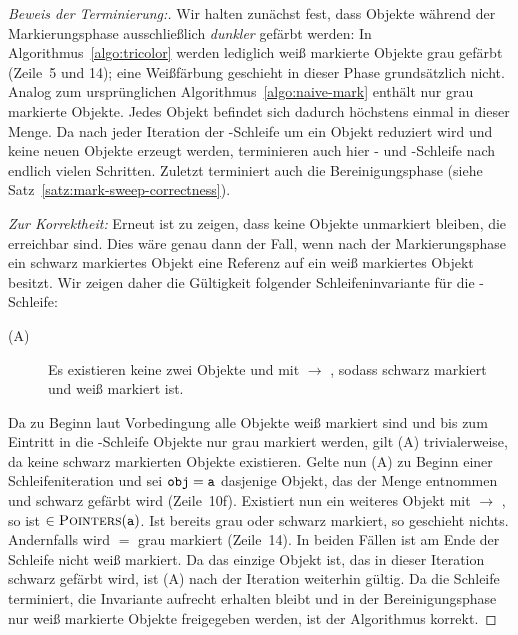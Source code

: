 \begin{proof}[Beweis der Terminierung:]
	Wir halten zunächst fest, dass Objekte während der Markierungsphase ausschließlich \textit{dunkler} gefärbt werden:
	In Algorithmus~\ref{algo:tricolor} werden lediglich weiß markierte Objekte grau gefärbt (Zeile~5 und 14); eine Weißfärbung geschieht in dieser Phase grundsätzlich nicht.
	Analog zum ursprünglichen Algorithmus~\ref{algo:naive-mark} enthält  nur grau markierte Objekte.
	Jedes Objekt befindet sich dadurch höchstens einmal in dieser Menge.
	Da  nach jeder Iteration der \WHILE-Schleife um ein Objekt reduziert wird und keine neuen Objekte erzeugt werden, terminieren auch hier \WHILE- und \FOREACH-Schleife nach endlich vielen Schritten.
	Zuletzt terminiert auch die Bereinigungsphase (siehe Satz~\ref{satz:mark-sweep-correctness}).
	
	\textit{Zur Korrektheit:} Erneut ist zu zeigen, dass keine Objekte unmarkiert bleiben, die erreichbar sind.
	Dies wäre genau dann der Fall, wenn nach der Markierungsphase ein schwarz markiertes Objekt eine Referenz auf ein weiß markiertes Objekt besitzt.
	Wir zeigen daher die Gültigkeit folgender Schleifeninvariante für die \WHILE-Schleife:
	\begin{description}
		\item[(A)] Es existieren keine zwei Objekte  und  mit  $\rightarrow$ , sodass  schwarz markiert und  weiß markiert ist.
	\end{description}
	Da zu Beginn laut Vorbedingung alle Objekte weiß markiert sind und bis zum Eintritt in die \WHILE-Schleife Objekte nur grau markiert werden, gilt (A) trivialerweise, da keine schwarz markierten Objekte existieren.
	Gelte nun (A) zu Beginn einer Schleifeniteration und sei $\texttt{obj} = \texttt{a}$ dasjenige Objekt, das der Menge  entnommen und schwarz gefärbt wird (Zeile~10f).
	Existiert nun ein weiteres Objekt  mit  $\rightarrow$ , so ist  $\in \textsc{Pointers}(\texttt{a})$.
	Ist  bereits grau oder schwarz markiert, so geschieht nichts.
	Andernfalls wird  $=$  grau markiert (Zeile~14).
	In beiden Fällen ist  am Ende der Schleife nicht weiß markiert.
	Da  das einzige Objekt ist, das in dieser Iteration schwarz gefärbt wird, ist (A) nach der Iteration weiterhin gültig.
	Da die Schleife terminiert, die Invariante aufrecht erhalten bleibt und in der Bereinigungsphase nur weiß markierte Objekte freigegeben werden, ist der Algorithmus korrekt.
\end{proof}

